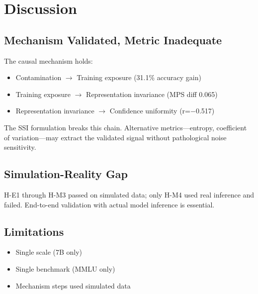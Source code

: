 \section{Discussion}

\subsection{Mechanism Validated, Metric Inadequate}

The causal mechanism holds:
\begin{itemize}
    \item Contamination $\rightarrow$ Training exposure (31.1\% accuracy gain)
    \item Training exposure $\rightarrow$ Representation invariance (MPS diff 0.065)
    \item Representation invariance $\rightarrow$ Confidence uniformity (r=$-$0.517)
\end{itemize}

The SSI formulation breaks this chain. Alternative metrics---entropy, coefficient of variation---may extract the validated signal without pathological noise sensitivity.

\subsection{Simulation-Reality Gap}

H-E1 through H-M3 passed on simulated data; only H-M4 used real inference and failed. End-to-end validation with actual model inference is essential.

\subsection{Limitations}

\begin{itemize}
    \item Single scale (7B only)
    \item Single benchmark (MMLU only)
    \item Mechanism steps used simulated data
\end{itemize}
